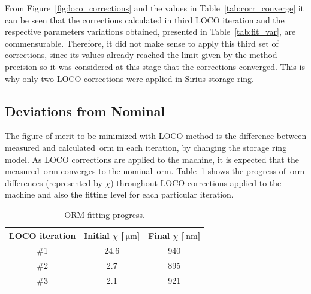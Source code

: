 From Figure~\ref{fig:loco_corrections} and the values in Table~\ref{tab:corr_converge} it can be seen that the corrections calculated in third LOCO iteration and the respective parameters variations obtained, presented in Table~\ref{tab:fit_var}, are commensurable. Therefore, it did not make sense to apply this third set of corrections, since its values already reached the limit given by the method precision so it was considered at this stage that the corrections converged. This is why only two LOCO corrections were applied in Sirius storage ring.

\subsection{Deviations from Nominal}
The figure of merit to be minimized with LOCO method is the difference between measured and calculated~\gls{orm} in each iteration, by changing the storage ring model. As LOCO corrections are applied to the machine, it is expected that the measured~\gls{orm} converges to the nominal~\gls{orm}. Table~\ref{tab:orm_progress} shows the progress of~\gls{orm} differences (represented by $\chi$) throughout LOCO corrections applied to the machine and also the fitting level for each particular iteration.
\begin{table}[h!]
    \centering
    \caption{ORM fitting progress.}
    \label{tab:orm_progress}
    \begin{tabular}{ccc}
        \toprule\toprule
        LOCO iteration & Initial $\chi$ [$\SI{}{\micro\meter}$] & Final $\chi$ [$\SI{}{\nano\meter}$] \\
        \hline
        \#1 & 24.6 & 940 \\
        \#2 & 2.7 & 895 \\
        \#3 & 2.1 & 921 \\
        \bottomrule\bottomrule
    \end{tabular}
\end{table}

